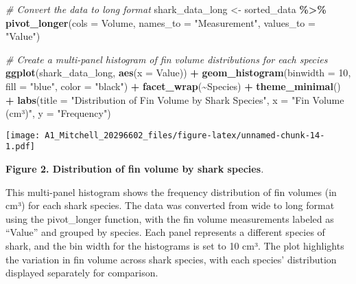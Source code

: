 \documentclass[
]{article}
\newenvironment{Shaded}{\begin{snugshade}}{\end{snugshade}}
\newcommand{\AttributeTok}[1]{\textcolor[rgb]{0.13,0.29,0.53}{#1}}
\newcommand{\CommentTok}[1]{\textcolor[rgb]{0.56,0.35,0.01}{\textit{#1}}}
\newcommand{\DecValTok}[1]{\textcolor[rgb]{0.00,0.00,0.81}{#1}}
\newcommand{\FunctionTok}[1]{\textcolor[rgb]{0.13,0.29,0.53}{\textbf{#1}}}
\newcommand{\NormalTok}[1]{#1}
\newcommand{\OtherTok}[1]{\textcolor[rgb]{0.56,0.35,0.01}{#1}}
\newcommand{\SpecialCharTok}[1]{\textcolor[rgb]{0.81,0.36,0.00}{\textbf{#1}}}
\newcommand{\StringTok}[1]{\textcolor[rgb]{0.31,0.60,0.02}{#1}}
\begin{document}
\begin{Shaded}
\begin{Highlighting}[]
\CommentTok{\# Convert the data to long format}
\NormalTok{shark\_data\_long }\OtherTok{\textless{}{-}}\NormalTok{ sorted\_data }\SpecialCharTok{\%\textgreater{}\%}
  \FunctionTok{pivot\_longer}\NormalTok{(}\AttributeTok{cols =}\NormalTok{ Volume, }\AttributeTok{names\_to =} \StringTok{"Measurement"}\NormalTok{, }\AttributeTok{values\_to =} \StringTok{"Value"}\NormalTok{)}

\CommentTok{\# Create a multi{-}panel histogram of fin volume distributions for each species}
\FunctionTok{ggplot}\NormalTok{(shark\_data\_long, }\FunctionTok{aes}\NormalTok{(}\AttributeTok{x =}\NormalTok{ Value)) }\SpecialCharTok{+}
  \FunctionTok{geom\_histogram}\NormalTok{(}\AttributeTok{binwidth =} \DecValTok{10}\NormalTok{, }\AttributeTok{fill =} \StringTok{"blue"}\NormalTok{, }\AttributeTok{color =} \StringTok{"black"}\NormalTok{) }\SpecialCharTok{+}
  \FunctionTok{facet\_wrap}\NormalTok{(}\SpecialCharTok{\textasciitilde{}}\NormalTok{Species) }\SpecialCharTok{+}
  \FunctionTok{theme\_minimal}\NormalTok{() }\SpecialCharTok{+}
  \FunctionTok{labs}\NormalTok{(}\AttributeTok{title =} \StringTok{"Distribution of Fin Volume by Shark Species"}\NormalTok{, }\AttributeTok{x =} \StringTok{"Fin Volume (cm³)"}\NormalTok{, }\AttributeTok{y =} \StringTok{"Frequency"}\NormalTok{)}
\end{Highlighting}
\end{Shaded}

\texttt{[image: A1\_Mitchell\_20296602\_files/figure-latex/unnamed-chunk-14-1.pdf]}

\textbf{Figure 2. Distribution of fin volume by shark species}\emph{.}

This multi-panel histogram shows the frequency distribution of fin
volumes (in cm³) for each shark species. The data was converted from
wide to long format using the pivot\_longer function, with the fin
volume measurements labeled as ``Value'' and grouped by species. Each
panel represents a different species of shark, and the bin width for the
histograms is set to 10 cm³. The plot highlights the variation in fin
volume across shark species, with each species' distribution displayed
separately for comparison.
\end{document}
